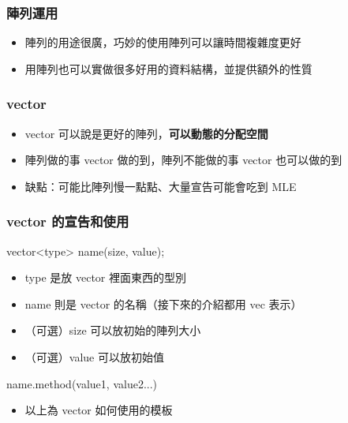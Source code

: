 \documentclass{beamer}
\begin{document}
\begin{frame}
    \frametitle{陣列運用}
    \begin{itemize}
        \item 陣列的用途很廣，巧妙的使用陣列可以讓時間複雜度更好
        \item 用陣列也可以實做很多好用的資料結構，並提供額外的性質
    \end{itemize}
\end{frame}

\begin{frame}
    \frametitle{vector}
    \begin{itemize}
        \item vector 可以說是更好的陣列，\textbf{可以動態的分配空間}
        \item 陣列做的事 vector 做的到，陣列不能做的事 vector 也可以做的到
        \item 缺點：可能比陣列慢一點點、大量宣告可能會吃到 MLE
    \end{itemize}
\end{frame}

\begin{frame}
    \frametitle{vector 的宣告和使用}
    vector<{\color[rgb]{1,0,0}type}> {\color[rgb]{1,0,0}name}({\color[rgb]{1,0,0}size}, {\color[rgb]{1,0,0}value});
    \begin{itemize}
        \item type 是放 vector 裡面東西的型別
        \item name 則是 vector 的名稱（接下來的介紹都用 vec 表示）
        \item （可選）size 可以放初始的陣列大小
        \item （可選）value 可以放初始值
    \end{itemize}
    \vspace{0.5cm}
    {\color[rgb]{1,0,0}name}.{\color[rgb]{1,0,0}method}({\color[rgb]{1,0,0}value1}, {\color[rgb]{1,0,0}value2}...)
    \begin{itemize}
        \item 以上為 vector 如何使用的模板
    \end{itemize}
\end{frame}
\end{document}
